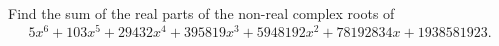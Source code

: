 Find the sum of the real parts of the non-real complex roots of
\[5x^6+103x^5+29432x^4+395819x^3+5948192x^2+78192834x+1938581923.\]
